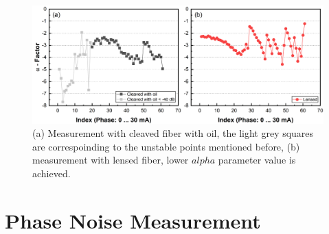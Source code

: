 \begin{figure}[ht]
    \centering
    \includegraphics[width=\linewidth]{figures/Alpha_Cleaved_and_Lensed.png}
    \caption{(a) Measurement with cleaved fiber with oil, the light grey squares are correspoinding to the unstable points mentioned before, (b) measurement with lensed fiber, lower $alpha$ parameter value is achieved.}
    \label{fig:Alpha_Cleaved_and_Lensed}
\end{figure}

\section{Phase Noise Measurement}

